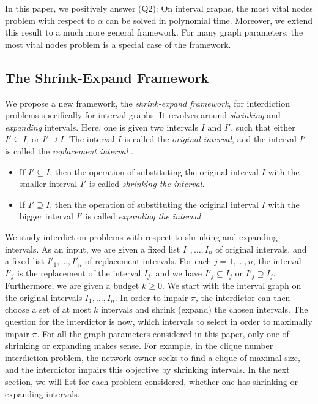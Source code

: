In this paper, we positively answer (Q2): On interval graphs, the most vital nodes problem with respect to $\alpha$ can be solved in polynomial time.  Moreover, we extend this result to a much more general framework. For many graph parameters, the most vital nodes problem is a special case of the framework.

\subsection{The Shrink-Expand Framework} 
We propose a new framework, the \emph{shrink-expand framework}, for interdiction problems specifically 
for interval graphs. It revolves around \emph{shrinking} and \emph{expanding} intervals. Here, one is given two intervals $I$ and $I'$, such that either $I' \subseteq I$, or $I' \supseteq I$. The interval $I$ is called the \emph{original interval}, and the interval $I'$ is called the \emph{replacement interval} .
\begin{itemize}
\item If $I' \subseteq I$, then the operation of substituting the original interval $I$ with the smaller interval $I'$ is called \emph{shrinking the interval.}
\item  If $I' \supseteq I$, then the operation of substituting the original interval $I$ with the bigger interval $I'$ is called \emph{expanding the interval.}
\end{itemize}
 
We study interdiction problems with respect to shrinking and expanding intervals. As an input, we are given a fixed list $I_1,\dots,I_n$ of original intervals, and a fixed list $I'_1,\dots,I'_n$ of replacement intervals. For each $j=1,\dots,n$, the interval $I'_j$ is the replacement of the interval $I_j$, and we have $I'_j \subseteq I_j$ or $I'_j \supseteq I_j$.
Furthermore, we are given a budget $k \geq 0$. We start with the interval graph on the original intervals $I_1,\dots,I_n$.
In order to impair $\pi$, the interdictor can then choose a set of at most $k$ intervals and shrink (expand) the chosen intervals.
The question for the interdictor is now, which intervals to select in order to maximally impair $\pi$. For all the graph parameters considered in this paper, only one of shrinking or expanding makes sense. For example, in the clique number interdiction problem, the network owner seeks to find a clique of maximal size, and the interdictor impairs this objective by shrinking intervals. In the next section, we will list for each problem considered, whether one has shrinking or expanding intervals.

